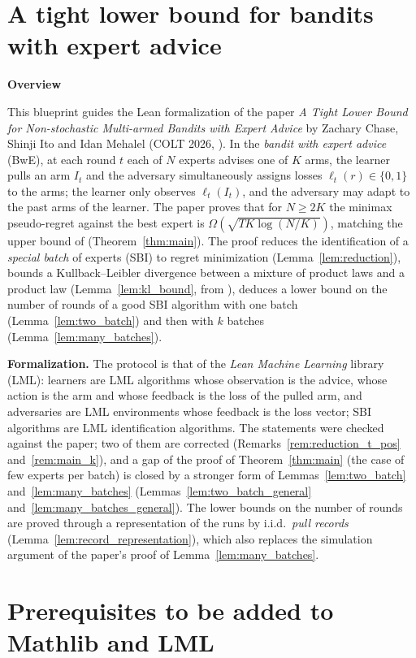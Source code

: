 
\part{A tight lower bound for bandits with expert advice}
\label{part:main}

\textbf{Overview}

This blueprint guides the Lean formalization of the paper \emph{A Tight Lower Bound for
Non-stochastic Multi-armed Bandits with Expert Advice} by Zachary Chase, Shinji Ito and Idan
Mehalel (COLT 2026, \cite{chase2026tight}). In the \emph{bandit with expert advice} (BwE), at each
round $t$ each of $N$ experts advises one of $K$ arms, the learner pulls an arm $I_t$ and the
adversary simultaneously assigns losses $\ell_t(r) \in \{0, 1\}$ to the arms; the learner only
observes $\ell_t(I_t)$, and the adversary may adapt to the past arms of the learner. The paper
proves that for $N \ge 2K$ the minimax pseudo-regret against the best expert is
$\Omega(\sqrt{T K \log(N/K)})$, matching the upper bound of \cite{kale2014multiarmed}
(Theorem~\ref{thm:main}). The proof reduces the identification of a \emph{special batch} of experts
(SBI) to regret minimization (Lemma~\ref{lem:reduction}), bounds a Kullback--Leibler divergence
between a mixture of product laws and a product law (Lemma~\ref{lem:kl_bound}, from
\cite{ito2024minimax}), deduces a lower bound on the number of rounds of a good SBI algorithm with
one batch (Lemma~\ref{lem:two_batch}) and then with $k$ batches (Lemma~\ref{lem:many_batches}).

\textbf{Formalization.} The protocol is that of the \emph{Lean Machine Learning} library (LML):
learners are LML algorithms whose observation is the advice, whose action is the arm and whose
feedback is the loss of the pulled arm, and adversaries are LML environments whose feedback is the
loss vector; SBI algorithms are LML identification algorithms. The statements were checked against
the paper; two of them are corrected (Remarks~\ref{rem:reduction_t_pos} and~\ref{rem:main_k}), and
a gap of the proof of Theorem~\ref{thm:main} (the case of few experts per batch) is closed by a
stronger form of Lemmas~\ref{lem:two_batch} and~\ref{lem:many_batches}
(Lemmas~\ref{lem:two_batch_general} and~\ref{lem:many_batches_general}). The lower bounds on the
number of rounds are proved through a representation of the runs by i.i.d.\ \emph{pull records}
(Lemma~\ref{lem:record_representation}), which also replaces the simulation argument of the
paper's proof of Lemma~\ref{lem:many_batches}.







\part{Prerequisites to be added to Mathlib and LML}
\label{part:prereq}



